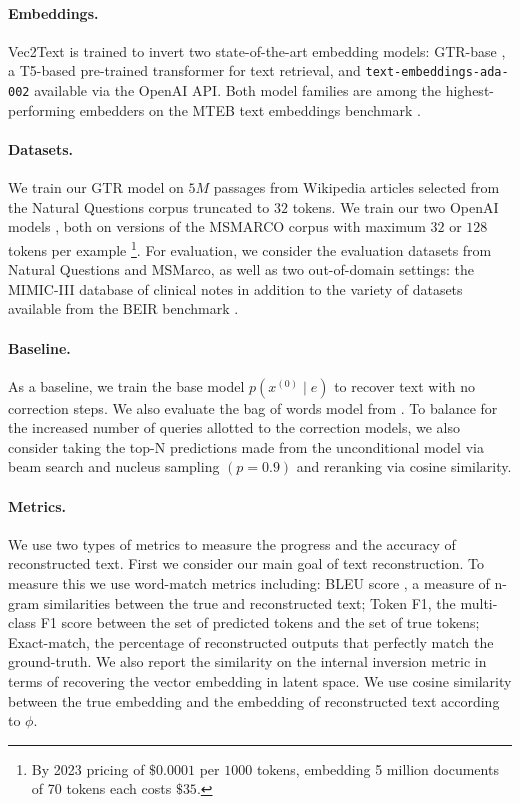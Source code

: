 \documentclass[11pt]{article}
\newcommand{\MethodName}{Vec2Text}
\begin{document}



\paragraph{Embeddings.} \MethodName{} is trained to invert two state-of-the-art embedding models: GTR-base \cite{ni2021gtr}, a T5-based pre-trained transformer for text retrieval, and \texttt{text-embeddings-ada-002} available via the OpenAI API. Both model families are among the highest-performing embedders on the MTEB text embeddings benchmark \cite{muennighoff2023mteb}.

\paragraph{Datasets.} We train our GTR model on $5M$ passages from Wikipedia articles selected from the Natural Questions corpus \cite{kwiatkowski2019naturalquestions} truncated to $32$ tokens. We train our two OpenAI models \cite{bajaj2018msmarco}, both on versions of the MSMARCO corpus with maximum $32$ or $128$ tokens per example \footnote{By 2023 pricing of $\$0.0001$ per $1000$ tokens, embedding 5 million documents of 70 tokens each costs $\$35$.}. For evaluation, we consider the evaluation datasets from Natural Questions and MSMarco, as well as two out-of-domain settings: the MIMIC-III database of clinical notes \cite{johnson2016mimiciii} in addition to the variety of datasets available from the BEIR benchmark \cite{thakur2021beir}.

\paragraph{Baseline.} As a baseline, we train the base model $p(x^{(0)} \mid e)$ to recover text with no correction steps. We also evaluate the bag of words model from \citet{song2020informationleakage}. To balance for the increased number of queries allotted to the correction models, we also consider taking the top-N predictions made from the unconditional model via beam search and nucleus sampling $(p = 0.9)$ and reranking via cosine similarity.

\paragraph{Metrics.} We use two types of metrics to measure the progress and the accuracy of reconstructed text. First we consider our main goal of text reconstruction. To measure this we use word-match metrics including: BLEU score \cite{papineni2002bleu}, a measure of n-gram similarities between the true and reconstructed text; Token F1, the multi-class F1 score between the set of predicted tokens and the set of true tokens; Exact-match, the percentage of reconstructed outputs that perfectly match the ground-truth.
We also report the similarity on the internal inversion metric in terms of recovering the vector embedding in latent space. We use cosine similarity between the true embedding and the embedding of reconstructed text according to $\phi$.
\end{document}
